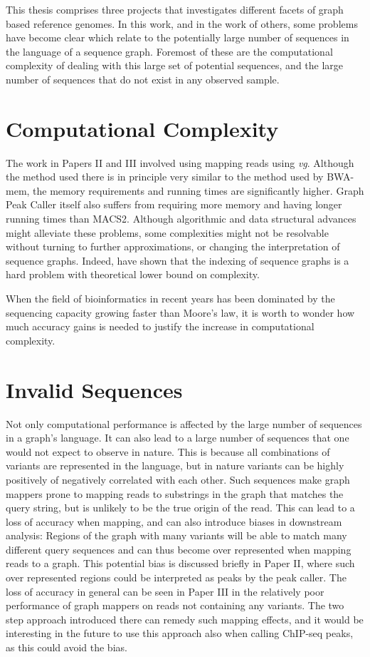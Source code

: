 This thesis comprises three projects that investigates different facets of graph based reference genomes.
In this work, and in the work of others, some problems have become clear which relate to the potentially large number of sequences in the language of a sequence graph. Foremost of these are the computational complexity of dealing with this large set of potential sequences, and the large number of sequences that do not exist in any observed sample.

\section{Computational Complexity}
The work in Papers II and III involved using mapping reads using \emph{vg}.
Although the method used there is in principle very similar to the method used by BWA-mem, the memory requirements and running times are significantly higher.
Graph Peak Caller itself also suffers from requiring more memory and having longer running times than MACS2. 
Although algorithmic and data structural advances might alleviate these problems, some complexities might not be resolvable without turning to further approximations, or changing the interpretation of sequence graphs.
Indeed, \citet{indexcomplexity} have shown that the indexing of sequence graphs is a hard problem with theoretical lower bound on complexity.

When the field of bioinformatics in recent years has been dominated by the sequencing capacity growing faster than Moore's law, it is worth to wonder how much accuracy gains is needed to justify the increase in computational complexity.

\section{Invalid Sequences}
Not only computational performance is affected by the large number of sequences in a graph's language.
It can also lead to a large number of sequences that one would not expect to observe in nature.
This is because all combinations of variants are represented in the language, but in nature variants can be highly positively of negatively correlated with each other.
Such sequences make graph mappers prone to mapping reads to substrings in the graph that matches the query string, but is unlikely to be the true origin of the read.
This can lead to a loss of accuracy when mapping, and can also introduce biases in downstream analysis: Regions of the graph with many variants will be able to match many different query sequences and can thus become over represented when mapping reads to a graph.
This potential bias is discussed briefly in Paper II, where such over represented regions could be interpreted as peaks by the peak caller.
The loss of accuracy in general can be seen in Paper III in the relatively poor performance of graph mappers on reads not containing any variants.
The two step approach introduced there can remedy such mapping effects, and it would be interesting in the future to use this approach also when calling ChIP-seq peaks, as this could avoid the bias.

